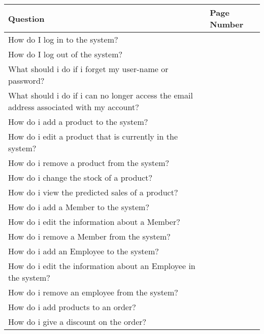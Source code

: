 \begin{center}
    \begin{longtable}{|p{8cm}|p{3cm}|}
        \hline
	 \textbf{Question} & \textbf{Page Number} \\ \hline
	How do I log in to the system? & \pageref{fig:Logging into the system} \\ \hline
	How do I log out of the system? & \pageref{fig:Logging out of the system} \\ \hline
	What should i do if i forget my user-name or password?&  \pageref{fig:Forgetting Your User-name or Password} \\ \hline
	What should i do if i can no longer access the email address associated with my account? &  \pageref{fig:Unable to access your email address} \\ \hline
	How do i add a product to the system? &  \pageref{fig:Adding a Product to the system} \\ \hline
	How do i edit a product that is currently in the system?&  \pageref{fig:Editing a Product in the system} \\ \hline
	How do i remove a product from the system?&  \pageref{fig:Removing a Product from the system} \\ \hline
	How do i change the stock of a product?&  \pageref{fig:Changing the stock of a Product} \\ \hline
	How do i view the predicted sales of a product?&  \pageref{fig:Product Stock Prediction} \\ \hline
	How do i add a Member to the system?&  \pageref{fig:Adding a Member to the system} \\ \hline
	How do i edit the information about a Member?&  \pageref{fig:Editing a Member currently in the system} \\ \hline
	How do i remove a Member from the system?&  \pageref{fig:Removing a Member from the system} \\ \hline
	How do i add an Employee to the system?&  \pageref{fig:Adding an Employee to the system} \\ \hline
	How do i edit the information about an Employee in the system?&  \pageref{fig:Editing an Employee in the system} \\ \hline
	How do i remove an employee from the system?&  \pageref{fig:Removing an Employee for the system.} \\ \hline
	How do i add products to an order?&  \pageref{fig:Adding products to an order} \\ \hline
	How do i give a discount on the order? &  \pageref{fig:Applying a Discount to an Order} \\ \hline

\end{longtable}
\end{center}
